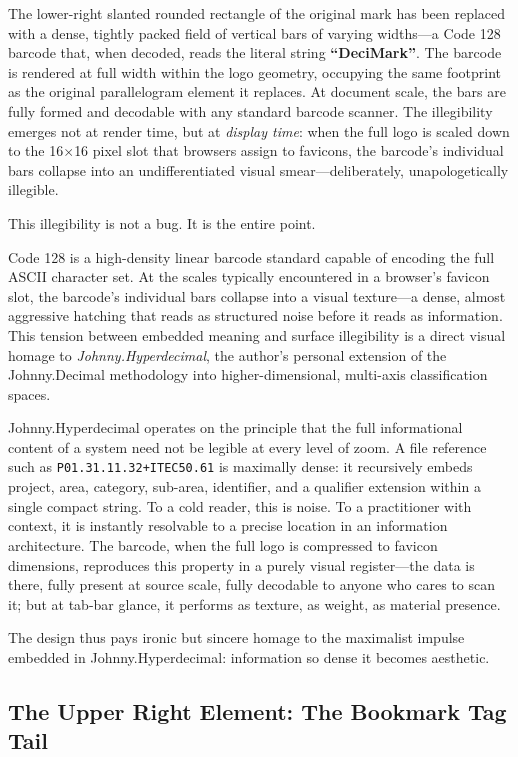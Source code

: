 \documentclass[11pt,a4paper]{book}
\begin{document}
The lower-right slanted rounded rectangle of the original mark has been replaced with a dense, tightly packed field of vertical bars of varying widths---a Code 128 barcode that, when decoded, reads the literal string \textbf{``DeciMark''}. The barcode is rendered at full width within the logo geometry, occupying the same footprint as the original parallelogram element it replaces. At document scale, the bars are fully formed and decodable with any standard barcode scanner. The illegibility emerges not at render time, but at \textit{display time}: when the full logo is scaled down to the 16$\times$16 pixel slot that browsers assign to favicons, the barcode's individual bars collapse into an undifferentiated visual smear---deliberately, unapologetically illegible.

This illegibility is not a bug. It is the entire point.

Code 128 is a high-density linear barcode standard capable of encoding the full ASCII character set. At the scales typically encountered in a browser's favicon slot, the barcode's individual bars collapse into a visual texture---a dense, almost aggressive hatching that reads as structured noise before it reads as information. This tension between embedded meaning and surface illegibility is a direct visual homage to \textit{Johnny.Hyperdecimal}, the author's personal extension of the Johnny.Decimal methodology into higher-dimensional, multi-axis classification spaces.

Johnny.Hyperdecimal operates on the principle that the full informational content of a system need not be legible at every level of zoom. A file reference such as \texttt{P01.31.11.32+ITEC50.61} is maximally dense: it recursively embeds project, area, category, sub-area, identifier, and a qualifier extension within a single compact string. To a cold reader, this is noise. To a practitioner with context, it is instantly resolvable to a precise location in an information architecture. The barcode, when the full logo is compressed to favicon dimensions, reproduces this property in a purely visual register---the data is there, fully present at source scale, fully decodable to anyone who cares to scan it; but at tab-bar glance, it performs as texture, as weight, as material presence.

The design thus pays ironic but sincere homage to the maximalist impulse embedded in Johnny.Hyperdecimal: information so dense it becomes aesthetic.

\subsection{The Upper Right Element: The Bookmark Tag Tail}
\end{document}
